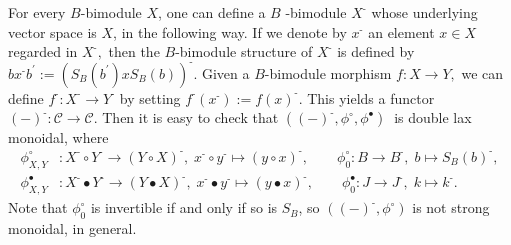 \documentclass[nosumlimits,twoside]{amsart}
\theoremstyle{definition}
\theoremstyle{remark}
\def\revsn{\text{-}}
\begin{document}
For every $B$-bimodule $X$, one can define a $B$%
-bimodule $X^{\revsn }$ whose underlying vector space is $X$, in the following
way. If we denote by $x^{\revsn }$ an element $x\in X$ regarded in $X^{\revsn },$
then the $B$-bimodule structure of $X^{\revsn }$ is defined by $bx^{\revsn }b^{\prime }:=\left(
S_{B}\left( b^{\prime }\right) xS_{B}\left( b\right) \right) ^{\revsn }.$
Given a $B$-bimodule morphism $f:X\rightarrow Y,$ we can define $f^{\revsn
}:X^{\revsn }\rightarrow Y^{\revsn }$ by setting $f^{\revsn }\left( x^{\revsn
}\right) :=f\left( x\right) ^{\revsn }.$ This yields a functor $\left(
-\right) ^{\revsn }:\mathcal{C}\rightarrow \mathcal{C}$. Then
it is easy to check that $\left( \left( -\right) ^{\revsn },\phi ^{\circ
},\phi ^{\bullet }\right) \ $ is double lax monoidal, where
\begin{align*}
\phi^\circ _{X,Y} &:X^{\revsn }\circ Y^{\revsn }\rightarrow \left( Y\circ X\right)
^{\revsn },\; x^{\revsn }\circ y^{\revsn }\mapsto \left( y\circ x\right) ^{\revsn
}, \qquad
\phi^\circ _{0} :B\rightarrow B^{\revsn },\; b\mapsto S_{B}\left( b\right)
^{\revsn },\\
\phi _{X,Y}^{\bullet } &:X^{\revsn }\bullet Y^{\revsn }\rightarrow \left(
Y\bullet X\right) ^{\revsn },\; x^{\revsn }\bullet y^{\revsn }\mapsto
\left( y\bullet x\right) ^{\revsn },\qquad
\phi _{0}^{\bullet } :J\rightarrow J^{\revsn },\; k\mapsto k^{\revsn }.
\end{align*}
Note that $\phi^\circ_0$ is  invertible if and only if so is $S_B$, so $((-)^\revsn,\phi^\circ)$ is not strong monoidal, in general.
\end{document}
